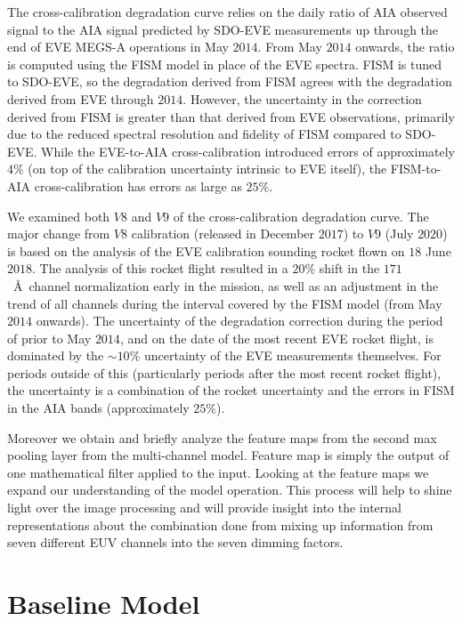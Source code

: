 \documentclass{aa}
\begin{document}
The cross-calibration degradation curve relies on the daily ratio of AIA observed signal to the AIA signal predicted by SDO-EVE measurements up through the end of EVE MEGS-A operations in May $2014$. From May $2014$ onwards, the ratio is computed using the FISM model \citep{Chamberlin2020} in place of the EVE spectra. FISM is tuned to SDO-EVE, so the degradation derived from FISM agrees with the degradation derived from EVE through $2014$. However, the uncertainty in the correction derived from FISM is greater than that derived from EVE observations, primarily due to the reduced spectral resolution and fidelity of FISM compared to SDO-EVE. While the EVE-to-AIA cross-calibration introduced errors of approximately $4\%$ (on top of the calibration uncertainty intrinsic to EVE itself), the FISM-to-AIA cross-calibration has errors as large as $25\%$. 

We examined both $V8$ and $V9$ of the cross-calibration degradation curve. The major change from $V8$ calibration (released in December $2017$) to $V9$ (July $2020$) is based on the analysis of the EVE calibration sounding rocket flown on $18$ June $2018$. The analysis of this rocket flight resulted in a $20\%$ shift in the $171$~\AA\ channel normalization early in the mission, as well as an adjustment in the trend of all channels during the interval covered by the FISM model (from May $2014$ onwards). The uncertainty of the degradation correction during the period of prior to May $2014$, and on the date of the most recent EVE rocket flight, is dominated by the $\sim10\%$ uncertainty of the EVE measurements themselves. For periods outside of this (particularly periods after the most recent rocket flight), the uncertainty is a combination of the rocket uncertainty and the errors in FISM in the AIA bands (approximately $25\%$).
 
Moreover we obtain and briefly analyze the feature maps from the second max pooling layer from the multi-channel model. Feature map is simply the output of one mathematical filter applied to the input. Looking at the feature maps we expand our understanding of the model operation. This process will help to shine light over the image processing and will provide insight into the internal representations about the combination done from mixing up information from seven different EUV channels into the seven dimming factors.

\section{Baseline Model}
\label{section:baseline}
\end{document}
